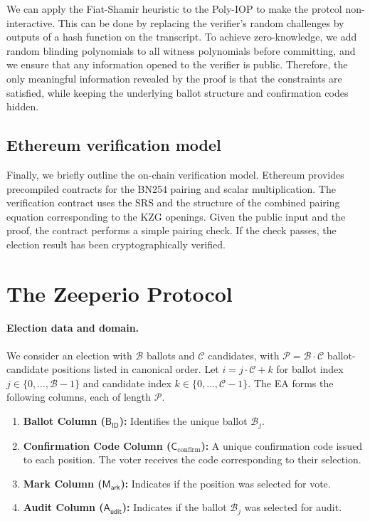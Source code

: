 \documentclass{llncs}
\begin{document}
We can apply the Fiat-Shamir heuristic to the Poly-IOP to make the protcol non-interactive.
This can be done by replacing the verifier's random challenges by outputs of a hash function on the transcript.
To achieve zero-knowledge, we add random blinding polynomials to all witness polynomials before committing, and we ensure that any information opened to the verifier is public.
Therefore, the only meaningful information revealed by the proof is that the constraints are satisfied, while keeping the underlying ballot structure and confirmation codes hidden.

\subsection{Ethereum verification model}

Finally, we briefly outline the on-chain verification model.
Ethereum provides precompiled contracts for the BN254 pairing and scalar multiplication.
The verification contract uses the SRS and the structure of the combined pairing equation corresponding to the KZG openings.
Given the public input and the proof, the contract performs a simple pairing check.
If the check passes, the election result has been cryptographically verified.

\section{The Zeeperio Protocol}

\paragraph{Election data and domain.}
We consider an election with $\mathcal{B}$ ballots and $\mathcal{C}$ candidates, with $\mathcal{P}=\mathcal{B}\cdot \mathcal{C}$ ballot-candidate positions listed in canonical order. 
Let $i=j\cdot \mathcal{C}+k$ for ballot index $j\in\{0,\dots,\mathcal{B}-1\}$ and candidate index $k\in\{0,\dots,\mathcal{C}-1\}$. 
The EA forms the following columns, each of length $\mathcal{P}$.
\begin{enumerate}
    \item \textbf{Ballot Column ($\mathsf{B_{ID}}$):} Identifies the unique ballot $\mathcal{B}_j$.
    \item \textbf{Confirmation Code Column ($\mathsf{C}_\text{confirm}$):} A unique confirmation code issued to each position. The voter receives the code corresponding to their selection.
    \item \textbf{Mark Column ($\mathsf{M_{ark}}$):} Indicates if the position was selected for vote.
    \item \textbf{Audit Column ($\mathsf{A_{udit}}$):} Indicates if the ballot $\mathcal{B}_j$ was selected for audit.
\end{enumerate}
\end{document}
